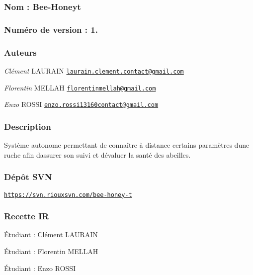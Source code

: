 \subsubsection*{Nom \+: Bee-\/\+Honey\textquotesingle{}t}

\subsubsection*{Numéro de version \+: 1.}

\subsubsection*{Auteurs}

{\itshape Clément} L\+A\+U\+R\+A\+IN \href{mailto:laurain.clement.contact@gmail.com}{\tt laurain.\+clement.\+contact@gmail.\+com}

{\itshape Florentin} M\+E\+L\+L\+AH \href{mailto:florentinmellah@gmail.com}{\tt florentinmellah@gmail.\+com}

{\itshape Enzo} R\+O\+S\+SI \href{mailto:enzo.rossi13160contact@gmail.com}{\tt enzo.\+rossi13160contact@gmail.\+com}

\subsubsection*{Description}

Système autonome permettant de connaître à distance certains paramètres d\textquotesingle{}une ruche afin d\textquotesingle{}assurer son suivi et d\textquotesingle{}évaluer la santé des abeilles.

\subsubsection*{Dépôt S\+VN}

\href{https://svn.riouxsvn.com/bee-honey-t}{\tt https\+://svn.\+riouxsvn.\+com/bee-\/honey-\/t}

\subsubsection*{Recette IR}


\begin{DoxyItemize}
\item Étudiant \+: Clément L\+A\+U\+R\+A\+IN
\item Étudiant \+: Florentin M\+E\+L\+L\+AH
\item Étudiant \+: Enzo R\+O\+S\+SI
\end{DoxyItemize}

